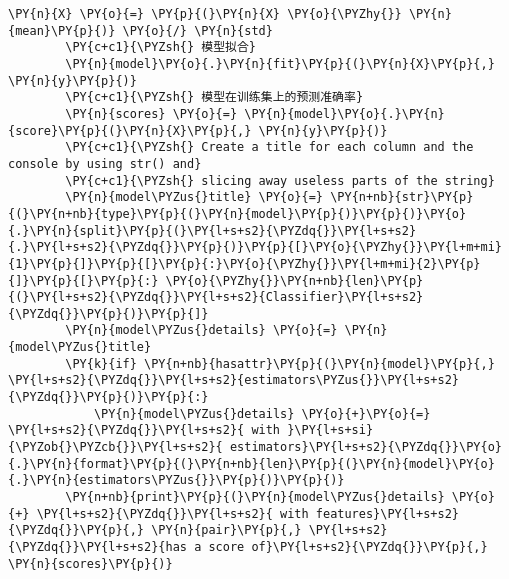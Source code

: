 \begin{Verbatim}[commandchars=\\\{\}]
        \PY{n}{X} \PY{o}{=} \PY{p}{(}\PY{n}{X} \PY{o}{\PYZhy{}} \PY{n}{mean}\PY{p}{)} \PY{o}{/} \PY{n}{std}
        \PY{c+c1}{\PYZsh{} 模型拟合}
        \PY{n}{model}\PY{o}{.}\PY{n}{fit}\PY{p}{(}\PY{n}{X}\PY{p}{,} \PY{n}{y}\PY{p}{)}
        \PY{c+c1}{\PYZsh{} 模型在训练集上的预测准确率}
        \PY{n}{scores} \PY{o}{=} \PY{n}{model}\PY{o}{.}\PY{n}{score}\PY{p}{(}\PY{n}{X}\PY{p}{,} \PY{n}{y}\PY{p}{)}
        \PY{c+c1}{\PYZsh{} Create a title for each column and the console by using str() and}
        \PY{c+c1}{\PYZsh{} slicing away useless parts of the string}
        \PY{n}{model\PYZus{}title} \PY{o}{=} \PY{n+nb}{str}\PY{p}{(}\PY{n+nb}{type}\PY{p}{(}\PY{n}{model}\PY{p}{)}\PY{p}{)}\PY{o}{.}\PY{n}{split}\PY{p}{(}\PY{l+s+s2}{\PYZdq{}}\PY{l+s+s2}{.}\PY{l+s+s2}{\PYZdq{}}\PY{p}{)}\PY{p}{[}\PY{o}{\PYZhy{}}\PY{l+m+mi}{1}\PY{p}{]}\PY{p}{[}\PY{p}{:}\PY{o}{\PYZhy{}}\PY{l+m+mi}{2}\PY{p}{]}\PY{p}{[}\PY{p}{:} \PY{o}{\PYZhy{}}\PY{n+nb}{len}\PY{p}{(}\PY{l+s+s2}{\PYZdq{}}\PY{l+s+s2}{Classifier}\PY{l+s+s2}{\PYZdq{}}\PY{p}{)}\PY{p}{]}
        \PY{n}{model\PYZus{}details} \PY{o}{=} \PY{n}{model\PYZus{}title}
        \PY{k}{if} \PY{n+nb}{hasattr}\PY{p}{(}\PY{n}{model}\PY{p}{,} \PY{l+s+s2}{\PYZdq{}}\PY{l+s+s2}{estimators\PYZus{}}\PY{l+s+s2}{\PYZdq{}}\PY{p}{)}\PY{p}{:}
            \PY{n}{model\PYZus{}details} \PY{o}{+}\PY{o}{=} \PY{l+s+s2}{\PYZdq{}}\PY{l+s+s2}{ with }\PY{l+s+si}{\PYZob{}\PYZcb{}}\PY{l+s+s2}{ estimators}\PY{l+s+s2}{\PYZdq{}}\PY{o}{.}\PY{n}{format}\PY{p}{(}\PY{n+nb}{len}\PY{p}{(}\PY{n}{model}\PY{o}{.}\PY{n}{estimators\PYZus{}}\PY{p}{)}\PY{p}{)}
        \PY{n+nb}{print}\PY{p}{(}\PY{n}{model\PYZus{}details} \PY{o}{+} \PY{l+s+s2}{\PYZdq{}}\PY{l+s+s2}{ with features}\PY{l+s+s2}{\PYZdq{}}\PY{p}{,} \PY{n}{pair}\PY{p}{,} \PY{l+s+s2}{\PYZdq{}}\PY{l+s+s2}{has a score of}\PY{l+s+s2}{\PYZdq{}}\PY{p}{,} \PY{n}{scores}\PY{p}{)}


\end{Verbatim}
